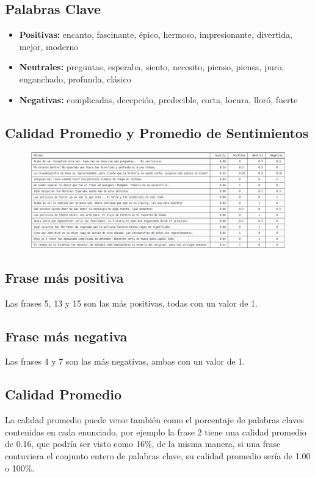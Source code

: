 \documentclass{article}
\begin{document}
    \subsection{Palabras Clave}
    \begin{itemize}
        \item \textbf{Positivas:} encanto, fascinante, épico, hermoso, impresionante, divertida, mejor, moderno
        \item \textbf{Neutrales:}  preguntas, esperaba, siento, necesito, pienso, piensa, puro, enganchado, profunda, clásico
        \item \textbf{Negativas:} complicadas, decepción, predecible, corta, locura, lloró, fuerte

    \end{itemize}

    \subsection{Calidad Promedio y Promedio de Sentimientos}
    \begin{figure}[H]
        \centering
        \includegraphics[width=1\linewidth]{assets/results}
    \end{figure}


    \subsection{Frase más positiva}
    Las frases 5, 13 y 15 son las más positivas, todas con un valor de 1.

    \subsection{Frase más negativa}
    Las frases 4 y 7 son las más negativas, ambas con un valor de 1.

    \subsection{Calidad Promedio}
    La calidad promedio puede verse también como el porcentaje de palabras claves contenidas en cada enunciado, por ejemplo la frase 2 tiene una calidad promedio de 0.16, que podría ser visto como 16\%, de la misma manera, si una frase contuviera el conjunto entero de palabras clave, su calidad promedio sería de 1.00 o 100\%.
\end{document}
